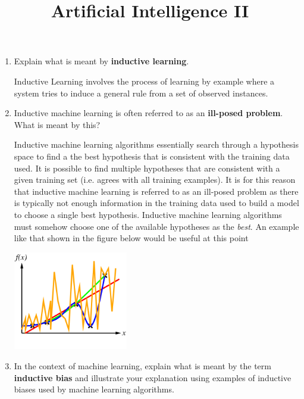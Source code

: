 \documentclass[solution]{ditpaper}
\title{Artificial Intelligence II}
\begin{document}

\question
\begin{enumerate}
	\item Explain what is meant by \textbf{inductive learning}.
	\begin{answer}
		Inductive Learning involves the process of learning by example where a system tries to induce a general rule from a set of observed instances.
	\end{answer}
		\item  Inductive machine learning is often referred to as an \textbf{ill-posed problem}. What is meant by this?
	\begin{answer}
		Inductive machine learning algorithms essentially search through a hypothesis space to find a the best hypothesis that is consistent with the training data used. It is possible to find multiple hypotheses that are  consistent with a given training set (i.e. agrees with all training examples).  It is for this reason that inductive machine learning is referred to as an ill-posed problem as there is typically not enough information in the training data used to build a model to choose a single best hypothesis. Inductive machine learning algorithms must somehow choose one of the available hypotheses as the \emph{best}. An example like that shown in the figure below would be useful at this point
		\begin{center}
			\includegraphics[width=5cm]{./images/curve-fitting5.png}
		\end{center}
	\end{answer}
	\item  In the context of machine learning, explain what is meant by the term \textbf{inductive bias} and illustrate your explanation using examples of inductive biases used by machine learning algorithms.
	\begin{answer}

\end{answer}
\end{enumerate}
\end{document}
